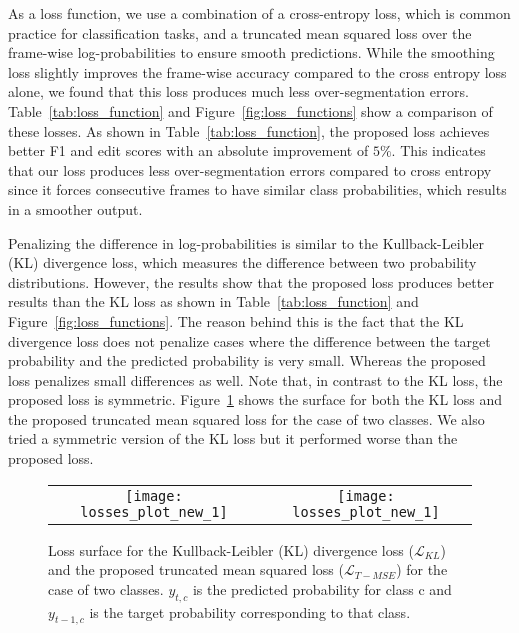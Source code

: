 \documentclass[10pt,twocolumn,letterpaper]{article}
\begin{document}
As a loss function, we use a combination of a cross-entropy loss, which 
is common practice for classification tasks, and a truncated mean squared 
loss over the frame-wise log-probabilities to ensure smooth predictions. 
While the smoothing loss slightly improves the frame-wise accuracy compared to 
the cross entropy loss alone, we found that this loss produces much less 
over-segmentation errors. Table~\ref{tab:loss_function} and 
Figure~\ref{fig:loss_functions} show a comparison of these losses. 
As shown in Table~\ref{tab:loss_function}, the proposed loss achieves 
better F1 and edit scores with an absolute improvement of $5\%$. This 
indicates that our loss produces less over-segmentation errors compared 
to cross entropy since it forces consecutive frames to have 
similar class probabilities, which results in a smoother output. 

Penalizing the difference in log-probabilities is similar to the Kullback-Leibler 
(KL) divergence loss, which measures the difference between two probability 
distributions. However, the results show that the proposed loss produces better 
results than the KL loss as shown in Table~\ref{tab:loss_function} 
and Figure~\ref{fig:loss_functions}. The reason behind this is the fact that 
the KL divergence loss does not penalize cases where the difference between the target 
probability and the predicted probability is very small. Whereas the proposed 
loss penalizes small differences as well. Note that, in contrast to the KL loss, 
the proposed loss is symmetric. Figure~\ref{fig:losses_plot} shows the surface 
for both the KL loss and the proposed truncated mean squared loss for the case 
of two classes. We also tried a symmetric version of the KL loss but it performed 
worse than the proposed loss.


\begin{figure}[tb]
\begin{center}
\begin{tabular}{cc}
   \texttt{[image: losses\_plot\_new\_1]} & \texttt{[image: losses\_plot\_new\_1]}
\end{tabular}
\end{center}
   \caption{Loss surface for the Kullback-Leibler (KL) divergence loss ($\mathcal{L}_{KL}$) 
   and the proposed truncated mean squared loss ($\mathcal{L}_{T-MSE}$) for the case of two 
   classes. $y_{t,c}$ is the predicted probability for class c and $y_{t-1,c}$ is the target 
   probability corresponding to that class.}
\label{fig:losses_plot}
\end{figure}
\end{document}
